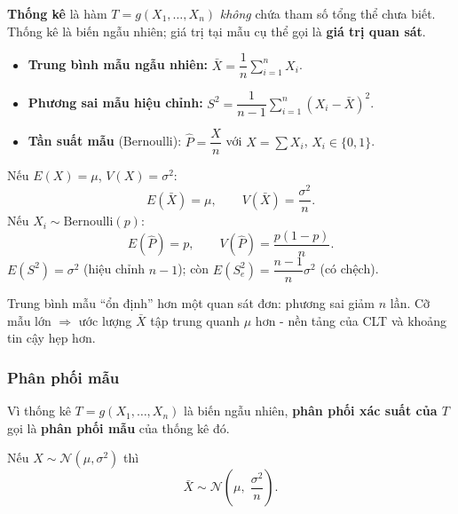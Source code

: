 \documentclass[12pt,a4paper]{article}
\begin{document}
\begin{dinhnghia}[title={Thống kê}]
  \textbf{Thống kê} là hàm $T = g(X_1, \ldots, X_n)$ \emph{không} chứa tham số tổng thể chưa biết. Thống kê là biến ngẫu nhiên; giá trị tại mẫu cụ thể gọi là \textbf{giá trị quan sát}.
\end{dinhnghia}

\begin{congthuc}[title={Thống kê mẫu thông dụng}]
  \begin{itemize}
    \item \textbf{Trung bình mẫu ngẫu nhiên:} $\bar{X} = \dfrac{1}{n}\displaystyle\sum_{i=1}^n X_i$.
    \item \textbf{Phương sai mẫu hiệu chỉnh:} $S^2 = \dfrac{1}{n-1}\displaystyle\sum_{i=1}^n (X_i - \bar{X})^2$.
    \item \textbf{Tần suất mẫu} (Bernoulli): $\hat{P} = \dfrac{X}{n}$ với $X = \displaystyle\sum X_i$, $X_i \in \{0,1\}$.
  \end{itemize}
\end{congthuc}

\begin{tinhchat}[title={Kỳ vọng và phương sai của $\bar{X}$, $\hat{P}$}]
  Nếu $E(X) = \mu$, $V(X) = \sigma^2$:
  \[
    E(\bar{X}) = \mu, \qquad V(\bar{X}) = \dfrac{\sigma^2}{n}.
  \]
  Nếu $X_i \sim \text{Bernoulli}(p)$:
  \[
    E(\hat{P}) = p, \qquad V(\hat{P}) = \dfrac{p(1-p)}{n}.
  \]
  $E(S^2) = \sigma^2$ (hiệu chỉnh $n-1$); còn $E(S_e^2) = \dfrac{n-1}{n}\sigma^2$ (có chệch).
\end{tinhchat}

\begin{ynghia}[title={Trực giác $V(\bar{X}) = \dfrac{\sigma^2}{n}$}]
Trung bình mẫu ``ổn định'' hơn một quan sát đơn: phương sai giảm $n$ lần. Cỡ mẫu lớn $\Rightarrow$ ước lượng $\bar{X}$ tập trung quanh $\mu$ hơn - nền tảng của CLT và khoảng tin cậy hẹp hơn.
\end{ynghia}

\subsubsection{Phân phối mẫu}

\begin{dinhnghia}[title={Phân phối mẫu}]
  Vì thống kê $T = g(X_1,\ldots,X_n)$ là biến ngẫu nhiên, \textbf{phân phối xác suất của $T$} gọi là \textbf{phân phối mẫu} của thống kê đó.
\end{dinhnghia}

\begin{dinhly}[title={Phân phối mẫu của $\bar{X}$ - tổng thể chuẩn}]
  Nếu $X \sim \mathcal{N}(\mu, \sigma^2)$ thì
  \[
    \bar{X} \sim \mathcal{N}\!\left(\mu,\; \dfrac{\sigma^2}{n}\right).
  \]
\end{dinhly}
\end{document}
